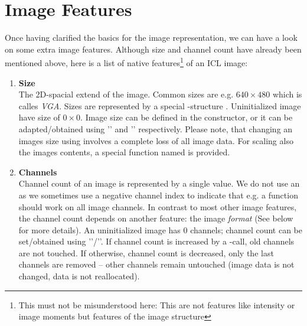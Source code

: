 \section{Image Features\label{sec:image-features}}
Once having clarified the basics for the image representation, we can have a look on some extra image features. Although size and channel count have already been mentioned above, here is a list of native features\footnote{This must not be misunderstood here: This are not features like intensity or image moments but features of the image structure} of an ICL image:

\begin{enumerate}

\item \textbf{Size}
\\The 2D-spacial extend of the image. Common sizes are e.g. $640 \times{} 480$ which is calles \emph{VGA}. Sizes are represented by a special -structure . Uninitialized image have size of $0 \times{} 0$. Image size can be defined in the constructor, or it can be adapted/obtained using '' and '' respectively. Please note, that changing an images size using  involves a complete loss of all image data. For scaling also the images contents, a special function named  is provided. 
\item \textbf{Channels}\\
 Channel count of an image is represented by a single  value. We do not use an  as we sometimes use a negative channel index to indicate that e.g. a function should work on all image channels. In contrast to most other image features, the channel count depends on another feature: the image \emph{format} (See below for more details). An uninitialized image has $0$ channels; channel count can be set/obtained using ''/''. If channel count is increased by a -call, old channels are not touched. If otherwise, channel count is decreased, only the last channels are removed -- other channels remain untouched (image data is not changed, data is not reallocated).


\end{enumerate}
